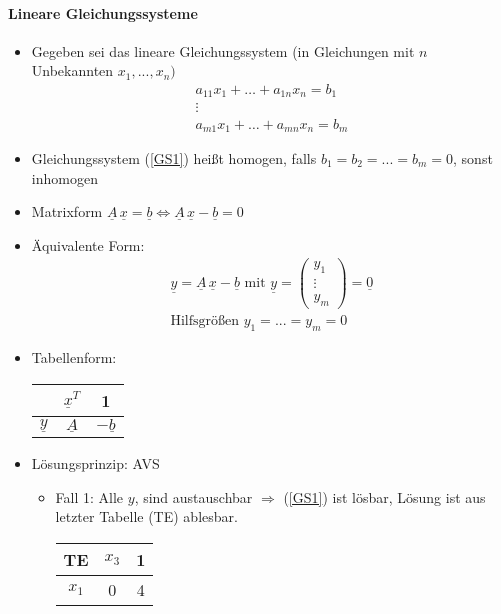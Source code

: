 \documentclass[a4paper]{scrartcl}
\begin{document}
\paragraph{Lineare Gleichungssysteme}
\begin{itemize}
\item Gegeben sei das lineare Gleichungssystem (in Gleichungen mit $n$ Unbekannten $x_1,...,x_n)$\\
\begin{equation} \label{GS1} \begin{array}{c} a_{11} x_1 + \dots + a_{1n} x_n = b_1\\
\vdots \\
a_{m1} x_1 + \dots + a_{mn} x_n = b_m \end{array} \end{equation}
\item Gleichungssystem (\ref{GS1}) heißt homogen, falls $b_1 = b_2 = ... = b_m = 0$, sonst inhomogen
\item Matrixform $\underline{A} \, \underline{x} = \underline{b} \Leftrightarrow \underline{A} \, \underline{x} - \underline{b} = 0$
\item Äquivalente Form: \begin{equation} \label{GS1'} \begin{array}{c} \underline{y} = \underline{A} \, \underline{x} - \underline{b} \text{ mit } \underline{y} = \begin{pmatrix} y_1 \\ \vdots \\ y_m \end{pmatrix} = \underline{0} \\ \text{Hilfsgrößen } y_1= ... = y_m = 0  \end{array} \end{equation}
\item Tabellenform:
\begin{tabular}{c|cc}
 & $\underline{x}^T$ & 1 \\ \hline
$\underline{y}$ & $\underline{A}$ & $-\underline{b}$
\end{tabular}
\item Lösungsprinzip: AVS
\begin{itemize}
\item Fall 1: Alle $y$, sind austauschbar $\Rightarrow $ (\ref{GS1}) ist lösbar, Lösung ist aus letzter Tabelle (TE) ablesbar.
\begin{tabular}{c|cc}
TE & $x_3$ & 1\\ \hline
$x_1$ & 0 & 4 \\

\end{tabular}
\end{itemize}
\end{itemize}
\end{document}
